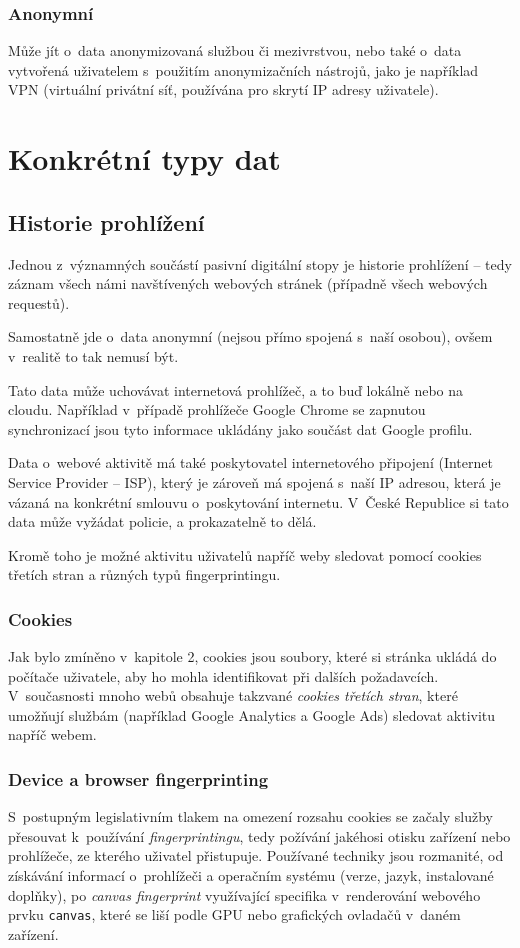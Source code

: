 \subsubsection{Anonymní}

Může jít o~data anonymizovaná službou či mezivrstvou, nebo také o~data vytvořená uživatelem s~použitím anonymizačních nástrojů, jako je například VPN (virtuální privátní síť, používána pro skrytí IP adresy uživatele).

\section{Konkrétní typy dat}

\subsection{Historie prohlížení}
Jednou z~významných součástí pasivní digitální stopy je historie prohlížení -- tedy záznam všech námi navštívených webových stránek (případně všech webových requestů).


Samostatně jde o~data anonymní (nejsou přímo spojená s~naší osobou), ovšem v~realitě to tak nemusí být.

Tato data může uchovávat internetová prohlížeč, a to buď lokálně nebo na cloudu. Například v~případě prohlížeče Google Chrome se zapnutou synchronizací jsou tyto informace ukládány jako součást dat Google profilu.

Data o~webové aktivitě má také poskytovatel internetového připojení (Internet Service Provider -- ISP), který je zároveň má spojená s~naší IP adresou, která je vázaná na konkrétní smlouvu o~poskytování internetu. V~České Republice si tato data může vyžádat policie, a prokazatelně to dělá\citep{policie-isp}.

Kromě toho je možné aktivitu uživatelů napříč weby sledovat pomocí cookies třetích stran a různých typů fingerprintingu.
\subsubsection{Cookies}
Jak bylo zmíněno v~kapitole 2, cookies jsou soubory, které si stránka ukládá do počítače uživatele, aby ho mohla identifikovat při dalších požadavcích. V~současnosti mnoho webů obsahuje takzvané \textit{cookies třetích stran}, které umožňují službám (například Google Analytics a Google Ads) sledovat aktivitu napříč webem.

\subsubsection{Device a browser fingerprinting}
S~postupným legislativním tlakem na omezení rozsahu cookies se začaly služby přesouvat k~používání \textit{fingerprintingu}, tedy požívání jakéhosi otisku zařízení nebo prohlížeče, ze kterého uživatel přistupuje. Používané techniky jsou rozmanité, od získávání informací o~prohlížeči a operačním systému (verze, jazyk, instalované doplňky), po \textit{canvas fingerprint} využívající specifika v~renderování webového prvku \verb|canvas|, které se liší podle GPU nebo grafických ovladačů v~daném zařízení.  

